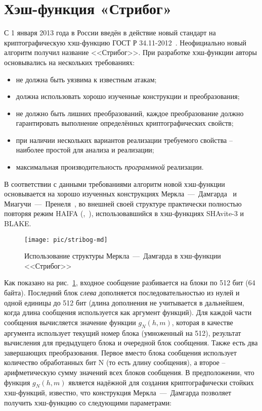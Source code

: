 \section{Хэш-функция «Стрибог»}\label{section-stribog}

С 1 января 2013 года в России введён в действие новый стандарт на криптографическую хэш-функцию ГОСТ Р 34.11-2012~\cite{GOST-R:34.11-2012}. Неофициально новый алгоритм получил название <<Стрибог>>. При разработке хэш-функции авторы основывались на нескольких требованиях:

\begin{itemize}
	\item не должна быть уязвима к известным атакам;
	\item должна использовать хорошо изученные конструкции и преобразования;
	\item не должно быть лишних преобразований, каждое преобразование должно гарантировать выполнение определённых криптографических свойств;
	\item при наличии нескольких вариантов реализации требуемого свойства -- наиболее простой для анализа и реализации;
	\item максимальная производительность \emph{программной} реализации.
\end{itemize}

В соответствии с данными требованиями алгоритм новой хэш-функции основывается на хорошо изученных конструкциях Меркла~---~Дамгарда~\cite{Merkle:1979, Merkle:1990, Damgard:1990} и Миагучи~---~Пренеля~\cite{Espen:Mieghem:1989, Miyaguchi:Ohta:Iwata:1990:03, Miyaguchi:Ohta:Iwata:1990:11}, во внешней своей структуре практически полностью повторяя режим HAIFA (,~\cite{Biham:Dunkelman:2007}), использовавшийся в хэш-функциях SHAvite-3 и BLAKE.

\begin{figure}[htb]
	\centering
	\texttt{[image: pic/stribog-md]}
  \caption{Использование структуры Меркла~---~Дамгарда в хэш-функции <<Стрибог>>}
  \label{fig:stribog-md}
\end{figure}

Как показано на рис.~\ref{fig:stribog-md}, входное сообщение разбивается на блоки по 512 бит (64 байта). Последний блок \emph{слева} дополняется последовательностью из нулей и  одной единицы до 512 бит (длина дополнения не учитывается в дальнейшем, когда длина сообщения используется как аргумент функций). Для каждой части сообщения вычисляется значение функции $g_N(h, m)$, которая в качестве аргумента использует текущий номер блока (умноженный на 512), результат вычисления для предыдущего блока и очередной блок сообщения. Также есть два завершающих преобразования. Первое вместо блока сообщения использует количество обработанных бит N (то есть длину сообщения), а второе -- арифметическую сумму значений всех блоков сообщения. В предположении, что функция $g_N(h, m)$ является надёжной для создания криптографически стойких хэш-функций, известно, что конструкция Меркла~---~Дамгарда позволяет получить хэш-функцию со следующими параметрами:

